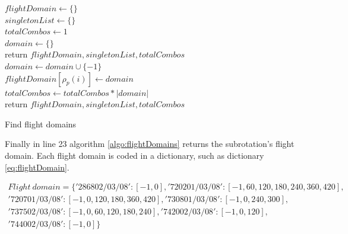		\begin{algorithm}[H]
		\DontPrintSemicolon
		$flightDomain \gets \{\}$\\
		$singletonList \gets \{\}$\\
		$totalCombos \gets 1$\\
		{
			$domain \gets \{\}$\\
				{return $flightDomain, singletonList, totalCombos$\\}
			$domain \gets domain \cup \{-1\}$\\ %
			$flightDomain[\rho_p(i)] \gets domain$\\
			$totalCombos \gets totalCombos * |domain|$\\
		}
		return $flightDomain, singletonList, totalCombos$
		\caption{Find flight domains}
		\label{algo:flightDomains}
	\end{algorithm}

Finally in line 23 algorithm \ref{algo:flightDomains} returns the subrotation's flight domain. Each flight domain is coded in a dictionary, such as dictionary \ref{eq:flightDomain}. 

\begin{equation}
	\begin{aligned}
	Flight \: domain = \{'286802/03/08': [-1, 0],
		'720201/03/08': [-1, 60, 120, 180, 240, 360, 420],\\
		'720701/03/08': [-1, 0, 120, 180, 360, 420],
		'730801/03/08': [-1, 0, 240, 300],\\
		'737502/03/08': [-1, 0, 60, 120, 180, 240],
		'742002/03/08': [-1, 0, 120],\\
		'744002/03/08': [-1, 0]\}\\ \\
	\end{aligned}
	\label{eq:flightDomain}
\end{equation}

